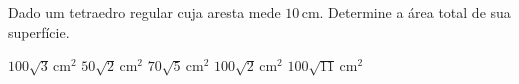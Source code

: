 Dado um tetraedro regular cuja aresta mede $10$\,cm. Determine a área total de sua superfície.

$100\sqrt{3}$\,cm$^2$
$50\sqrt{2}$\,cm$^2$
$70\sqrt{5}$\,cm$^2$
$100\sqrt{2}$\,cm$^2$
$100\sqrt{11}$\,cm$^2$



